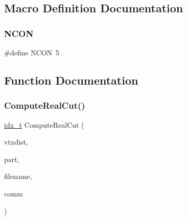 \subsection{Macro Definition Documentation}
\mbox{\label{a00437_a9214dfc9b3f48a9499d9db889783b938}} 
\subsubsection{\texorpdfstring{N\+C\+ON}{NCON}}
{\footnotesize\ttfamily \#define N\+C\+ON~5}



\subsection{Function Documentation}
\mbox{\label{a00437_a725d56a999dc467b3f7883eea465bab2}} 
\subsubsection{\texorpdfstring{Compute\+Real\+Cut()}{ComputeRealCut()}}
{\footnotesize\ttfamily \hyperlink{a00876_aaa5262be3e700770163401acb0150f52}{idx\+\_\+t} Compute\+Real\+Cut (\begin{DoxyParamCaption}\item[{\hyperlink{a00876_aaa5262be3e700770163401acb0150f52}{idx\+\_\+t} $\ast$}]{vtxdist,  }\item[{\hyperlink{a00876_aaa5262be3e700770163401acb0150f52}{idx\+\_\+t} $\ast$}]{part,  }\item[{char $\ast$}]{filename,  }\item[{M\+P\+I\+\_\+\+Comm}]{comm }\end{DoxyParamCaption})}

